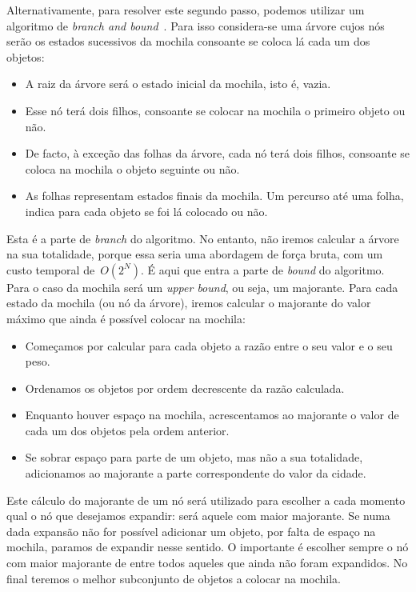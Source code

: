 \documentclass[12pt,a4paper,reqno]{report}
\numberwithin{figure}{section}
\numberwithin{equation}{section}
\begin{document}
Alternativamente, para resolver este segundo passo, podemos utilizar um algoritmo de \emph{branch and bound}~\cite{tube_bnb_kp, Narahari:2000}. Para isso considera-se uma árvore cujos nós serão os estados sucessivos da mochila consoante se coloca lá cada um dos objetos:
\begin{itemize} 
	\item A raiz da árvore será o estado inicial da mochila, isto é, vazia.
	\item Esse nó terá dois filhos, consoante se colocar na mochila o primeiro objeto ou não.
	\item De facto, à exceção das folhas da árvore, cada nó terá dois filhos, consoante se coloca na mochila o objeto seguinte ou não.
	\item As folhas representam estados finais da mochila. Um percurso até uma folha, indica para cada objeto se foi lá colocado ou não.
\end{itemize}
Esta é a parte de \emph{branch} do algoritmo. No entanto, não iremos calcular a árvore na sua totalidade, porque essa seria uma abordagem de força bruta, com um custo temporal de~$O(2^N)$. É aqui que entra a parte de \emph{bound} do algoritmo. Para o caso da mochila será um \emph{upper bound}, ou seja, um majorante. Para cada estado da mochila (ou nó da árvore), iremos calcular o majorante do valor máximo que ainda é possível colocar na mochila:
\begin{itemize}
	\item Começamos por calcular para cada objeto a razão entre o seu valor e o seu peso.
	\item Ordenamos os objetos por ordem decrescente da razão calculada.
	\item Enquanto houver espaço na mochila, acrescentamos ao majorante o valor de cada um dos objetos pela ordem anterior.
	\item Se sobrar espaço para parte de um objeto, mas não a sua totalidade, adicionamos ao majorante a parte correspondente do valor da cidade.
\end{itemize}
Este cálculo do majorante de um nó será utilizado para escolher a cada momento qual o nó que desejamos expandir: será aquele com maior majorante. Se numa dada expansão não for possível adicionar um objeto, por falta de espaço na mochila, paramos de expandir nesse sentido. O importante é escolher sempre o nó com maior majorante de entre todos aqueles que ainda não foram expandidos. No final teremos o melhor subconjunto de objetos a colocar na mochila.
\end{document}
